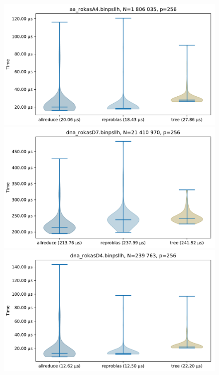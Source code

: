 \begin{figure}\centering\ContinuedFloat
\includegraphics[scale=\mScale]{figures/violinRokasA4.pdf}
\includegraphics[scale=\mScale]{figures/violinRokasD7.pdf}
\includegraphics[scale=\mScale]{figures/violinRokasD4.pdf}

\end{figure}
